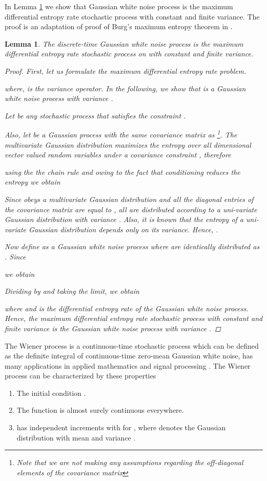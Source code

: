 \documentclass{article}
\newtheorem{lem}{Lemma}
\begin{document}
In Lemma \ref{lem:WGN} we show that Gaussian white noise
process is the maximum differential entropy rate stochastic process
with constant and finite variance. The proof is an adaptation of
proof of Burg's maximum entropy theorem in \cite{Cover}.
\begin{lem}
\label{lem:WGN} The discrete-time Gaussian white noise
process is the maximum differential entropy rate stochastic process
on  with constant and finite variance.
\begin{proof}
First, let us formulate the  maximum differential entropy rate
problem.

where,  is the variance operator. In the
following, we show that  is a Gaussian white noise process
with variance .

Let  be any stochastic process that  satisfies the constraint .

Also, let  be a Gaussian process
with the same covariance matrix as  \footnote{Note that we are not making any assumptions
regarding the off-diagonal elements of the covariance matrix}. The
multivariate Gaussian distribution maximizes the entropy over all
dimensional  vector valued random variables under a covariance
constraint \cite{Cover}, therefore

using the  the chain rule and owing to the fact that conditioning reduces the entropy we obtain

Since  obeys a multivariate Gaussian distribution and all the diagonal entries  of the covariance matrix are equal to , all  are distributed according to a uni-variate Gaussian distribution with variance . Also, it is known that the entropy of a uni-variate Gaussian distribution depends only on its variance.  Hence, .

Now define  as a Gaussian white noise process where  are identically distributed as . Since

we obtain

Dividing by  and taking the limit, we obtain

where  and is the differential entropy rate of the
Gaussian white noise process. Hence, the maximum differential
entropy rate stochastic process with constant and finite variance
 is the Gaussian white noise process with variance
.
\end{proof}
\end{lem}

The Wiener process  is a continuous-time stochastic process
which can be defined as the definite integral of continuous-time
zero-mean Gaussian white noise, has many applications in applied mathematics
and signal processing \cite{arnold}. The Wiener process can be
characterized by these properties~\cite{durrett2010}
\begin{enumerate}
\item The initial condition .\vspace{-2mm}
\item The function  is almost surely continuous everywhere.\vspace{-2mm}
\item  has independent increments with   for  , where  denotes the Gaussian distribution with mean  and variance .\vspace{-2mm}
\end{enumerate}
\end{document}
